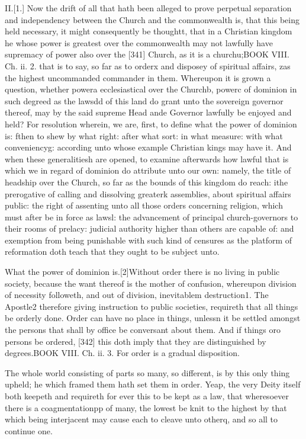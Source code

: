 II.[1.] Now the drift of all that hath been alleged to prove perpetual separation and independency between the Church and the commonwealth is, that this being held necessary, it might consequently be thoughtt, that in a Christian kingdom he whose power is greatest over the commonwealth may not lawfully have supremacy of power also over the [341] Church, as it is a churchu;BOOK VIII. Ch. ii. 2. that is to say, so far as to orderx and disposey of spiritual affairs, zas the highest uncommanded commander in them. Whereupon it is grown a question, whether powera ecclesiastical over the Churchb, powerc of dominion in such degreed as the lawsdd of this land do grant unto the sovereign governor thereof, may by the said supreme Head ande Governor lawfully be enjoyed and held? For resolution wherein, we are, first, to define what the power of dominion is: fthen to shew by what right: after what sort: in what measure: with what conveniencyg: according unto whose example Christian kings may have it. And when these generalitiesh are opened, to examine afterwards how lawful that is which we in regard of dominion do attribute unto our own: namely, the title of headship over the Church, so far as the bounds of this kingdom do reach: ithe prerogative of calling and dissolving greaterk assemblies, about spiritual affairs public: the right of assenting unto all those orders concerning religion, which must after be in force as lawsl: the advancement of principal church-governors to their rooms of prelacy: judicial authority higher than others are capable of: and exemption from being punishable with such kind of censures as the platform of reformation doth teach that they ought to be subject unto.

What the power of dominion is.[2]Without order there is no living in public society, because the want thereof is the mother of confusion, whereupon division of necessity followeth, and out of division, inevitablem destruction1. The Apostle2 therefore giving instruction to public societies, requireth that all things be orderly done. Order can have no place in things, unlessn it be settled amongst the persons that shall by office be conversant about them. And if things oro persons be ordered, [342] this doth imply that they are distinguished by degrees.BOOK VIII. Ch. ii. 3. For order is a gradual disposition.

The whole world consisting of parts so many, so different, is by this only thing upheld; he which framed them hath set them in order. Yeap, the very Deity itself both keepeth and requireth for ever this to be kept as a law, that wheresoever there is a coagmentationpp of many, the lowest be knit to the highest by that which being interjacent may cause each to cleave unto otherq, and so all to continue one.

